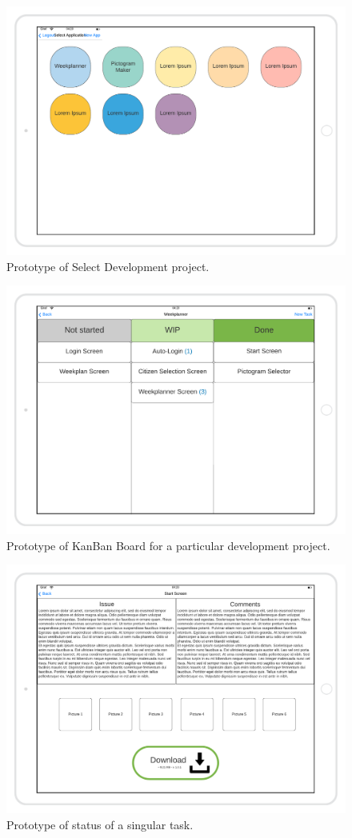 \begin{figure}[H]
    \centering
        \includegraphics[width=\textwidth]{images/Select-App-Mockup.png}
        \caption{Prototype of Select Development project.}
\end{figure}
\begin{figure}[H]
    \centering
    \includegraphics[width=\textwidth]{images/KanBan-mockup.png}
    \caption{Prototype of KanBan Board for a particular development project.}
\end{figure}
\begin{figure}[H]
    \centering
    \includegraphics[width=\textwidth]{images/view-a-task-mockup.png}
    \caption{Prototype of status of a singular task.}
    \label{FIG:mockupIssuesComments}
\end{figure}